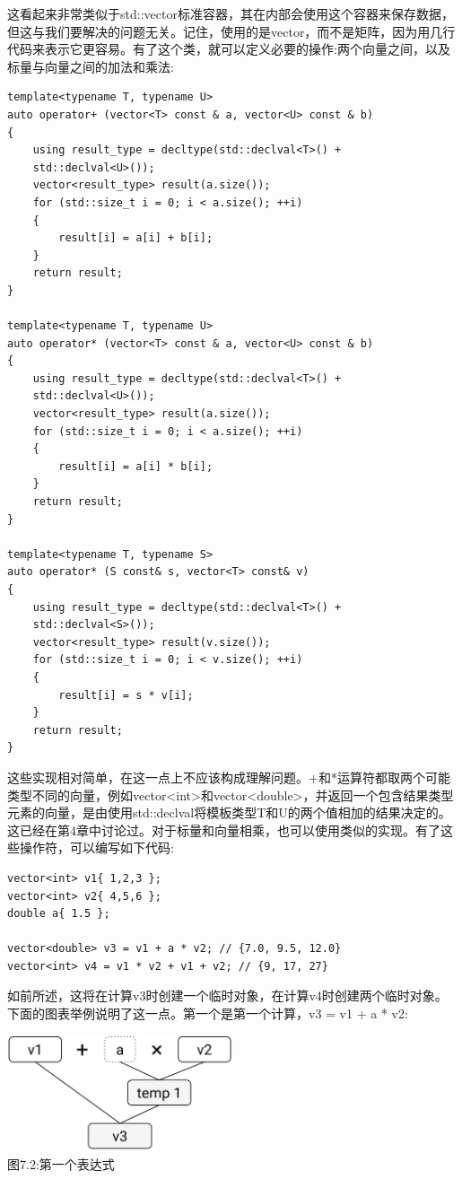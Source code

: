 这看起来非常类似于std::vector标准容器，其在内部会使用这个容器来保存数据，但这与我们要解决的问题无关。记住，使用的是vector，而不是矩阵，因为用几行代码来表示它更容易。有了这个类，就可以定义必要的操作:两个向量之间，以及标量与向量之间的加法和乘法:

\begin{lstlisting}[style=styleCXX]
template<typename T, typename U>
auto operator+ (vector<T> const & a, vector<U> const & b)
{
	using result_type = decltype(std::declval<T>() +
	std::declval<U>());
	vector<result_type> result(a.size());
	for (std::size_t i = 0; i < a.size(); ++i)
	{
		result[i] = a[i] + b[i];
	}
	return result;
}

template<typename T, typename U>
auto operator* (vector<T> const & a, vector<U> const & b)
{
	using result_type = decltype(std::declval<T>() +
	std::declval<U>());
	vector<result_type> result(a.size());
	for (std::size_t i = 0; i < a.size(); ++i)
	{
		result[i] = a[i] * b[i];
	}
	return result;
}

template<typename T, typename S>
auto operator* (S const& s, vector<T> const& v)
{
	using result_type = decltype(std::declval<T>() +
	std::declval<S>());
	vector<result_type> result(v.size());
	for (std::size_t i = 0; i < v.size(); ++i)
	{
		result[i] = s * v[i];
	}
	return result;
}
\end{lstlisting}

这些实现相对简单，在这一点上不应该构成理解问题。+和*运算符都取两个可能类型不同的向量，例如vector<int>和vector<double>，并返回一个包含结果类型元素的向量，是由使用std::declval将模板类型T和U的两个值相加的结果决定的。这已经在第4章中讨论过。对于标量和向量相乘，也可以使用类似的实现。有了这些操作符，可以编写如下代码:

\begin{lstlisting}[style=styleCXX]
vector<int> v1{ 1,2,3 };
vector<int> v2{ 4,5,6 };
double a{ 1.5 };

vector<double> v3 = v1 + a * v2; // {7.0, 9.5, 12.0}
vector<int> v4 = v1 * v2 + v1 + v2; // {9, 17, 27}
\end{lstlisting}

如前所述，这将在计算v3时创建一个临时对象，在计算v4时创建两个临时对象。下面的图表举例说明了这一点。第一个是第一个计算，v3 = v1 + a * v2:

\begin{center}
\includegraphics[width=0.5\textwidth]{content/3/chapter7/images/2.png}\\
图7.2:第一个表达式
\end{center}


